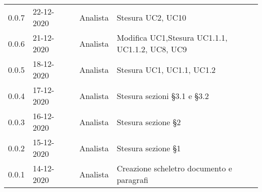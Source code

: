 {{\begin{longtable}{C{1.7cm} C{2.5cm} C{3.2cm} C{2.7cm} C{4.8cm}}
0.0.7 & 22-12-2020 & \SG{} & Analista & Stesura UC2, UC10\\
0.0.6 & 21-12-2020 & \BM{} & Analista & Modifica UC1,\newline Stesura UC1.1.1, UC1.1.2, UC8, UC9\\
0.0.5 & 18-12-2020 & \SP{} & Analista & Stesura UC1, UC1.1, UC1.2\\
0.0.4 & 17-12-2020 & \SP{} & Analista & Stesura sezioni §3.1 e §3.2\\	
0.0.3 & 16-12-2020 & \SP{} & Analista & Stesura sezione §2\\
0.0.2 & 15-12-2020 & \SP{} & Analista & Stesura sezione §1\\
0.0.1 & 14-12-2020 & \SP{} & Analista & Creazione scheletro documento e paragrafi\\
		
\end{longtable}
}
}
